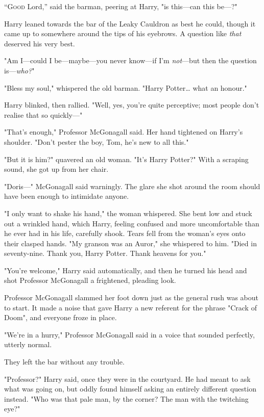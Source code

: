 
\lettrine{“G}{ood} Lord,'' said the barman, peering at Harry, "is this—can this be—?"

Harry leaned towards the bar of the Leaky Cauldron as best he could, though it
came up to somewhere around the tips of his eyebrows. A question like
\emph{that} deserved his very best.

"Am I—could I be—maybe—you never know—if I'm \emph{not}—but then the
question is—\emph{who?}"

"Bless my soul," whispered the old barman. "Harry Potter{\ldots} what an
honour."

Harry blinked, then rallied. "Well, yes, you're quite perceptive; most people
don't realise that so quickly—"

"That's enough," Professor McGonagall said. Her hand tightened on Harry's
shoulder. "Don't pester the boy, Tom, he's new to all this."

"But it is him?" quavered an old woman. "It's Harry Potter?" With a scraping
sound, she got up from her chair.

"Doris—" McGonagall said warningly. The glare she shot around the room should
have been enough to intimidate anyone.

"I only want to shake his hand," the woman whispered. She bent low and stuck
out a wrinkled hand, which Harry, feeling confused and more uncomfortable than
he ever had in his life, carefully shook. Tears fell from the woman's eyes onto
their clasped hands. "My granson was an Auror," she whispered to him. "Died in
seventy-nine. Thank you, Harry Potter. Thank heavens for you."

"You're welcome," Harry said automatically, and then he turned his head and
shot Professor McGonagall a frightened, pleading look.

Professor McGonagall slammed her foot down just as the general rush was about
to start. It made a noise that gave Harry a new referent for the phrase "Crack
of Doom", and everyone froze in place.

"We're in a hurry," Professor McGonagall said in a voice that sounded
perfectly, utterly normal.

They left the bar without any trouble.

"Professor?" Harry said, once they were in the courtyard. He had meant to ask
what was going on, but oddly found himself asking an entirely different
question instead. "Who was that pale man, by the corner? The man with the
twitching eye?"

